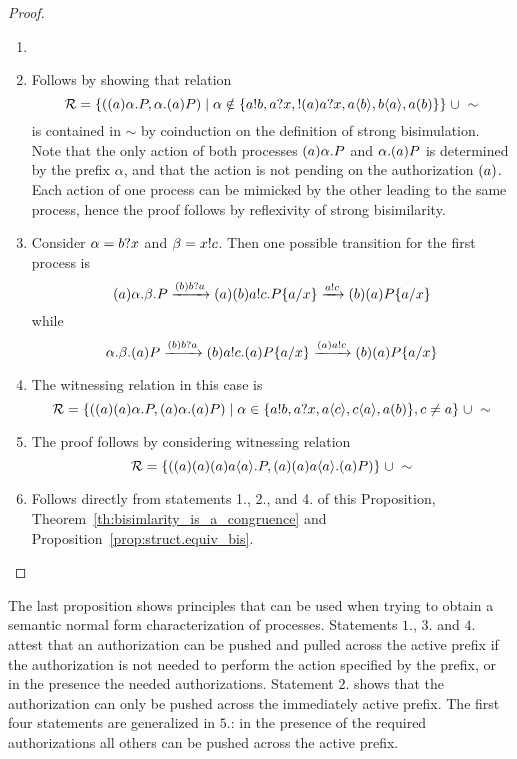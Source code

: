 \begin{proof}
\begin{enumerate}\item[]{}
\item Follows by showing that relation 
\[
{\cal R}=\{((a)\alpha.P, \alpha.(a)P)\;|\; \alpha\notin\{a!b, a?x,!(a)a?x,a\langle b\rangle, b\langle a\rangle, a(b)\}\} \;\cup\; \sim
\] 
is contained in $\sim$ by coinduction on the definition of strong bisimulation. Note that the only action of both processes $(a)\alpha.P$ and $\alpha.(a)P$ is determined by the prefix $\alpha$, and that the action is not pending on the authorization $(a)$. Each action of one process can be mimicked by the other leading to the same process, hence the proof follows by reflexivity of strong bisimilarity.
\item Consider $\alpha=b?x$ and $\beta=x!c$. 
Then one possible transition for the first process is 
\[(a)\alpha.\beta.P\xrightarrow{{(b)}b?a} (a)(b)a!c.P\{a/x\}\xrightarrow{a!c}(b)(a)P\{a/x\}
\]
while 
\[
\alpha.\beta.(a)P\xrightarrow{{(b)}b?a} (b)a!c.(a)P\{a/x\}\xrightarrow{{(a)}a!c}(b)(a)P\{a/x\}
\]
\item The witnessing relation in this case is
\[
{\cal R}=\{((a)(a)\alpha.P, (a)\alpha.(a)P)\;|\; \alpha\in\{a!b, a?x,a\langle c\rangle, c\langle a\rangle, a(b)\}, c\not=a\} \;\cup\; \sim
\] 
\item The proof follows by considering witnessing relation 
\[
{\cal R}=\{((a)(a)(a)a\langle a\rangle.P , (a)(a)a\langle a\rangle.(a)P)\} \;\cup\; \sim
\] 
\item Follows directly from statements 1., 2., and 4. of this Proposition, Theorem~\ref{th:bisimlarity_is_a_congruence} and Proposition~\ref{prop:struct.equiv_bis}.
\end{enumerate}
\end{proof}



The last proposition shows principles that can be used when trying to obtain  a semantic normal form characterization of processes. Statements $1.$, $3.$ and $4.$ attest that
an authorization can be pushed and pulled across the active prefix if the authorization is not needed to perform the action specified by the prefix, or in the presence the needed authorizations.  Statement $2.$ shows that the authorization can only be pushed across the immediately active prefix. The first four statements are generalized in $5.$: in the presence of the required authorizations all others can be pushed across the active prefix. %

